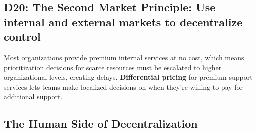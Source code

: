 \documentclass{article}
\begin{document}
\begin{multicols}{2}
\subsection{D20: The Second Market Principle: Use internal and external markets to decentralize control}

Most organizations provide premium internal services at no cost, which means prioritization decisions for scarce resources must be escalated to higher organizational levels, creating delays. \textbf{Differential pricing} for premium support services lets teams make localized decisions on when they're willing to pay for additional support.

\end{multicols}

\begin{center}
  \section{The Human Side of Decentralization}
\end{center}
\end{document}

